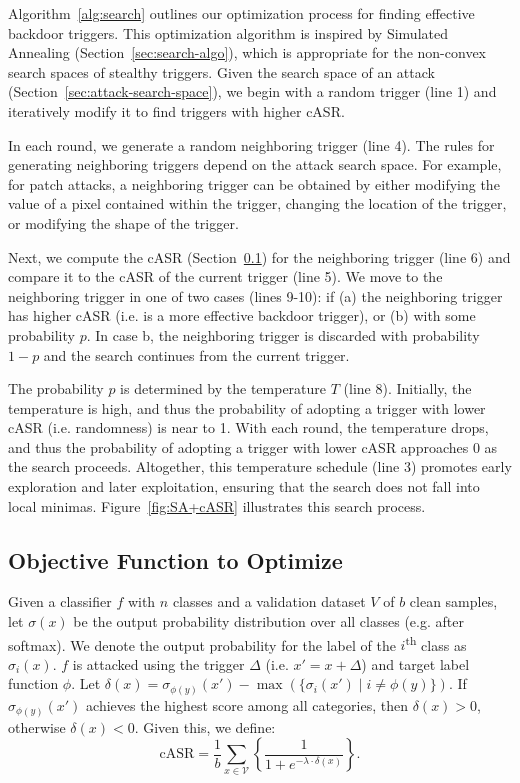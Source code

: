 \documentclass[letterpaper,twocolumn,10pt]{article}
\begin{document}
Algorithm~\ref{alg:search} outlines our optimization process for finding effective backdoor triggers. This optimization algorithm is inspired by Simulated Annealing (Section~\ref{sec:search-algo}), which is appropriate for the non-convex search spaces of stealthy triggers. Given the search space of an attack (Section~\ref{sec:attack-search-space}), we begin with a random trigger (line 1) and iteratively modify it to find triggers with higher cASR.

In each round, we generate a random neighboring trigger (line 4). The rules for generating neighboring triggers depend on the attack search space. For example, for patch attacks, a neighboring trigger can be obtained by either modifying the value of a pixel contained within the trigger, changing the location of the trigger, or modifying the shape of the trigger.

Next, we compute the cASR (Section~\ref{sec:objective}) for the neighboring trigger (line 6) and compare it to the cASR of the current trigger (line 5). We move to the neighboring trigger in one of two cases (lines 9-10): if (a) the neighboring trigger has higher cASR (i.e. is a more effective backdoor trigger), or (b) with some probability $p$. In case b, the neighboring trigger is discarded with probability $1-p$ and the search continues from the current trigger.

The probability $p$ is determined by the temperature $T$ (line 8). Initially, the temperature is high, and thus the probability of adopting a trigger with lower cASR (i.e. randomness) is near to 1. With each round, the temperature drops, and thus the probability of adopting a trigger with lower cASR approaches 0 as the search proceeds. Altogether, this temperature schedule (line 3) promotes early exploration and later exploitation, ensuring that the search does not fall into local minimas. Figure~\ref{fig:SA+cASR} illustrates this search process.

\subsection{Objective Function to Optimize}
\label{sec:objective}

Given a classifier $f$ with $n$ classes and a validation dataset $V$ of $b$ clean samples, let $\sigma(x)$ be the output probability distribution over all classes (e.g. after softmax). We denote the output probability for the label of the $i$\textsuperscript{th} class as $\sigma_i(x)$. $f$ is attacked using the trigger $\Delta$ (i.e. $x'=x+\Delta$) and target label function $\phi$. Let $\delta(x) = \sigma_{\phi(y)}(x') - \max(\{\sigma_{i}(x') \mid i \neq \phi(y)\})$. If $\sigma_{\phi(y)}(x')$ achieves the highest score among all categories, then $\delta(x)>0$, otherwise $\delta(x)<0$. Given this, we define:
\begin{equation}
    \text{cASR} = \frac{1}{b}\sum_{x \in \mathcal{V}}\left\{\frac{1}{1+e^{-\lambda \cdot \delta(x)}}\right\}.
\label{eq:cASR}
\end{equation}
\end{document}
